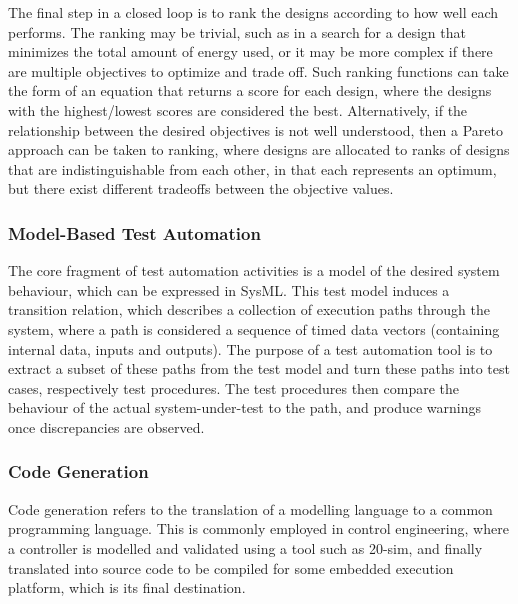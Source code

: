 
The final step in a closed loop is to rank the designs according to how well each performs.
The ranking may be trivial, such as in a search for a design that minimizes the total amount of energy used, or it may be more complex if there are multiple objectives to optimize and trade off.
Such ranking functions can take the form of an equation that returns a score for each design, where the designs with the highest/lowest scores are considered the best.
Alternatively, if the relationship between the desired objectives is not well understood, then a Pareto approach can be taken to ranking, where designs are allocated to ranks of designs that are indistinguishable from each other, in that each represents an optimum, but there exist different tradeoffs between the objective values.


\subsubsection{Model-Based Test Automation}
\label{sec:concepts:mbta}
The core fragment of test automation activities is a model of the desired system behaviour, which can be expressed in SysML.
This test model induces a transition relation, which describes a collection of execution paths through the system, where a path is considered a sequence of timed data vectors (containing internal data, inputs and outputs).
The purpose of a test automation tool is to extract a subset of these paths from the test model and turn these paths into test
cases, respectively test procedures.
The test procedures then compare the behaviour of the actual system-under-test to the path, and produce warnings once discrepancies are observed.

\subsubsection{Code Generation}
\label{sec:concepts:codegen}
Code generation refers to the translation of a modelling language to a common programming language.
This is commonly employed in control engineering, where a controller is modelled and validated using a tool such as 20-sim, and finally translated into source code to be compiled for some embedded execution platform, which is its final destination.


